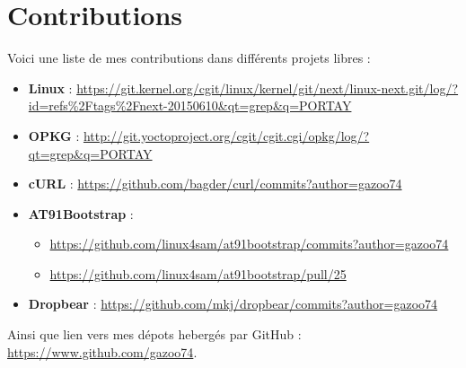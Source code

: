 \documentclass[a4paper]{article}
\begin{document}
\section{Contributions}
Voici une liste de mes contributions dans différents projets libres :
\begin{itemize}
\item \textbf{Linux} : \url{https://git.kernel.org/cgit/linux/kernel/git/next/linux-next.git/log/?id=refs\%2Ftags\%2Fnext-20150610&qt=grep&q=PORTAY}
\item \textbf{OPKG} : \url{http://git.yoctoproject.org/cgit/cgit.cgi/opkg/log/?qt=grep&q=PORTAY}
\item \textbf{cURL} : \url{https://github.com/bagder/curl/commits?author=gazoo74}
\item \textbf{AT91Bootstrap} :
\begin{itemize}
\item \url{https://github.com/linux4sam/at91bootstrap/commits?author=gazoo74}
\item \url{https://github.com/linux4sam/at91bootstrap/pull/25}
\end{itemize}
\item \textbf{Dropbear} : \url{https://github.com/mkj/dropbear/commits?author=gazoo74}
\end{itemize}
Ainsi que lien vers mes dépots hebergés par GitHub : \url{https://www.github.com/gazoo74}.
\end{document}
